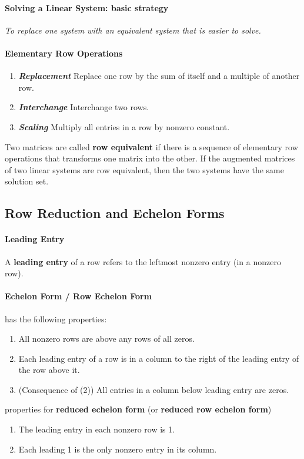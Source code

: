 \documentclass{article}
\begin{document}
	\paragraph{Solving a Linear System: basic strategy} \emph{To replace one system with an equivalent system that is easier to solve.}
	\paragraph{Elementary Row Operations}
	\begin{enumerate}
		\item \emph{\textbf{Replacement}} Replace one row by the sum of itself and a multiple of another row.
		\item \emph{\textbf{Interchange}} Interchange two rows.
		\item \emph{\textbf{Scaling}} Multiply all entries in a row by nonzero constant.
	\end{enumerate}
	Two matrices are called \textbf{row equivalent} if there is a sequence of elementary row operations that transforms one matrix into the other. If the augmented matrices of two linear systems are row equivalent, then the two systems have the same solution set.
	\subsection{Row Reduction and Echelon Forms}
	\paragraph{Leading Entry} A \textbf{leading entry} of a row refers to the leftmost nonzero entry (in a nonzero row).
	\paragraph{Echelon Form / Row Echelon Form} has the following properties:
	\begin{enumerate}
		\item All nonzero rows are above any rows of all zeros.
		\item Each leading entry of a row is in a column to the right of the leading entry of the row above it.
		\item (Consequence of (2)) All entries in a column below leading entry are zeros.
	\end{enumerate}
	 properties for \textbf{reduced echelon form} (or \textbf{reduced row echelon form})
	\begin{enumerate}
		\item The leading entry in each nonzero row is 1.
		\item Each leading 1 is the only nonzero entry in its column.
	\end{enumerate}
\end{document}
